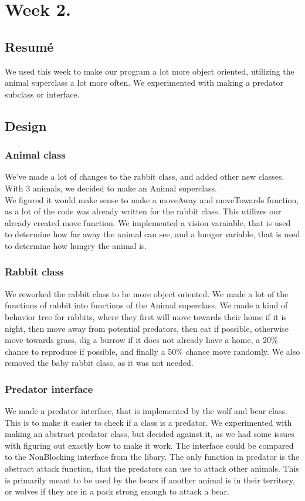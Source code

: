\documentclass[11pt]{article}
\begin{document}
    \section*{Week 2.}
    \subsection*{Resumé}
    We used this week to make our program a lot more object oriented, utilizing the animal superclass a lot more often. 
    We experimented with making a predator subclass or interface. 
    \subsection*{Design}
    \subsubsection*{Animal class}
    We've made a lot of changes to the rabbit class, and added other new classes. With 3 animals, we decided to make an Animal superclass.
    \\
    We figured it would make sense to make a moveAway and moveTowards function, as a lot of the code was already written for the rabbit class. 
    This utilizes our already created move function. We implemented a vision varaiable, that is used to determine how far away the animal can see, and a 
    hunger variable, that is used to determine how hungry the animal is.
    \subsubsection*{Rabbit class}
    We reworked the rabbit class to be more object oriented. We made a lot of the functions of rabbit into functions of the Animal superclass. 
    We made a kind of behavior tree for rabbits, where they first will move towards their home if it is night, then move away from potential predators,
    then eat if possible, otherwise move towards grass, dig a burrow if it does not already have a home, a 20\% chance to reproduce if possible, 
    and finally a 50\% chance move randomly. We also removed the baby rabbit class, as it was not needed.
    \subsubsection*{Predator interface}
    We made a predator interface, that is implemented by the wolf and bear class. This is to make it easier to check if a class is a predator. 
    We experimented with making an abstract predator class, but decided against it, as we had some issues with figuring out exactly how to make it work. 
    The interface could be compared to the NonBlocking interface from the libary. 
    The only function in predator is the abstract attack function, that the predators can use to attack other animals. This is primarily meant to be used by 
    the bears if another animal is in their territory, or wolves if they are in a pack strong enough to attack a bear.
\end{document}
